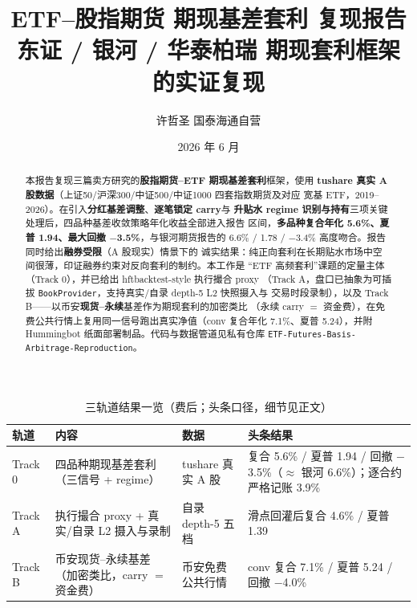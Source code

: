 \documentclass[11pt]{ctexart}
\title{\textbf{ETF--股指期货 期现基差套利 复现报告}\\[4pt]
\large 东证 / 银河 / 华泰柏瑞 期现套利框架的实证复现}
\author{许哲圣 \quad 国泰海通自营}
\date{2026 年 6 月}
\newcommand{\pct}[1]{#1\%}
\begin{document}
\maketitle

\begin{abstract}
\noindent
本报告复现三篇卖方研究的\textbf{股指期货--ETF 期现基差套利}框架，使用
\textbf{tushare 真实 A 股数据}（上证50/沪深300/中证500/中证1000 四套指数期货及对应
宽基 ETF，2019--2026）。在引入\textbf{分红基差调整}、\textbf{逐笔锁定 carry}与
\textbf{升贴水 regime 识别与持有}三项关键处理后，四品种基差收敛策略年化收益全部进入报告
区间，\textbf{多品种复合年化 5.6\%、夏普 1.94、最大回撤 $-$3.5\%}，与银河期货报告的
6.6\% / 1.78 / $-$3.4\% 高度吻合。报告同时给出\textbf{融券受限}（A 股现实）情景下的
诚实结果：纯正向套利在长期贴水市场中空间很薄，印证融券约束对反向套利的制约。本工作是
``ETF 高频套利''课题的定量主体（Track 0），并已给出 hftbacktest-style 执行撮合 proxy
（Track A，盘口已抽象为可插拔 \texttt{BookProvider}，支持真实/自录 depth-5 L2 快照摄入与
交易时段录制），以及 Track B——以币安\textbf{现货--永续}基差作为期现套利的加密类比
（永续 carry $=$ 资金费），在免费公共行情上复用同一信号跑出真实净值（conv 复合年化
\pct{7.1}、夏普 5.24），并附 Hummingbot 纸面部署制品。代码与数据管道见私有仓库
\texttt{ETF-Futures-Basis-Arbitrage-Reproduction}。
\end{abstract}

\begin{table}[h]\centering\small
\caption{三轨道结果一览（费后；头条口径，细节见正文）}\label{tab:overview}
\begin{tabular}{>{\raggedright\arraybackslash}p{1.7cm}
                >{\raggedright\arraybackslash}p{4.4cm}
                >{\raggedright\arraybackslash}p{2.5cm}
                >{\raggedright\arraybackslash}p{4.6cm}}
\toprule
轨道 & 内容 & 数据 & 头条结果 \\
\midrule
Track 0 & 四品种期现基差套利（三信号 + regime） & tushare 真实 A 股 & 复合 \pct{5.6} / 夏普 1.94 / 回撤 $-$\pct{3.5}（$\approx$ 银河 \pct{6.6}）；逐合约严格记账 \pct{3.9} \\
Track A & 执行撮合 proxy + 真实/自录 L2 摄入与录制 & 自录 depth-5 五档 & 滑点回灌后复合 \pct{4.6} / 夏普 1.39 \\
Track B & 币安现货--永续基差（加密类比，carry $=$ 资金费） & 币安免费公共行情 & conv 复合 \pct{7.1} / 夏普 5.24 / 回撤 $-$\pct{4.0} \\
\bottomrule
\end{tabular}
\end{table}
\end{document}
